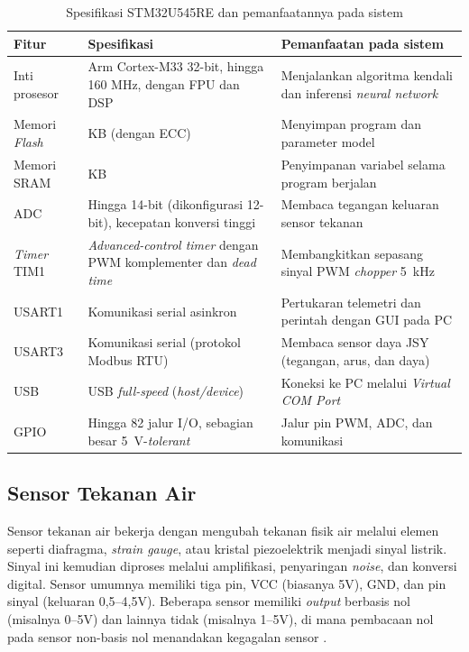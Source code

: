 \begin{table}[H]
\caption{Spesifikasi STM32U545RE dan pemanfaatannya pada sistem}
\centering
\renewcommand{\arraystretch}{1.4}
\begin{tabularx}{\linewidth}{|
  >{\raggedright\arraybackslash\hsize=0.8\hsize}X|
  >{\raggedright\arraybackslash\hsize=1.0\hsize}X|
  >{\raggedright\arraybackslash\hsize=1.2\hsize}X|}
\hline
\textbf{Fitur} & \textbf{Spesifikasi} & \textbf{Pemanfaatan pada sistem} \\
\hline
Inti prosesor & Arm Cortex-M33 32-bit, hingga 160 MHz, dengan FPU dan DSP &
Menjalankan algoritma kendali dan inferensi \emph{neural network} \\
\hline
Memori \emph{Flash} & 512 KB (dengan ECC) &
Menyimpan program dan parameter model \\
\hline
Memori SRAM & 274 KB &
Penyimpanan variabel selama program berjalan \\
\hline
ADC & Hingga 14-bit (dikonfigurasi 12-bit), kecepatan konversi tinggi &
Membaca tegangan keluaran sensor tekanan \\
\hline
\emph{Timer} TIM1 & \emph{Advanced-control timer} dengan PWM komplementer dan
\emph{dead time} & Membangkitkan sepasang sinyal PWM \emph{chopper} 5~kHz \\
\hline
USART1 & Komunikasi serial asinkron &
Pertukaran telemetri dan perintah dengan GUI pada PC \\
\hline
USART3 & Komunikasi serial (protokol Modbus RTU) &
Membaca sensor daya JSY (tegangan, arus, dan daya) \\
\hline
USB & 1 USB \emph{full-speed} (\emph{host/device}) &
Koneksi ke PC melalui \emph{Virtual COM Port} \\
\hline
GPIO & Hingga 82 jalur I/O, sebagian besar 5~V-\emph{tolerant} &
Jalur pin PWM, ADC, dan komunikasi \\
\hline
\end{tabularx}
\label{tab:spek-stm32}
\end{table}

\subsection{Sensor Tekanan Air}

Sensor tekanan air bekerja dengan mengubah tekanan fisik air melalui elemen seperti
diafragma, \emph{strain gauge}, atau kristal piezoelektrik menjadi sinyal listrik. Sinyal ini
kemudian diproses melalui amplifikasi, penyaringan \emph{noise}, dan konversi digital. Sensor
umumnya memiliki tiga pin, VCC (biasanya 5V), GND, dan pin sinyal (keluaran 0,5–4,5V).
Beberapa sensor memiliki \emph{output} berbasis nol (misalnya 0–5V) dan lainnya tidak (misalnya
1–5V), di mana pembacaan nol pada sensor non-basis nol menandakan kegagalan sensor
\parencite{waterpress}.

